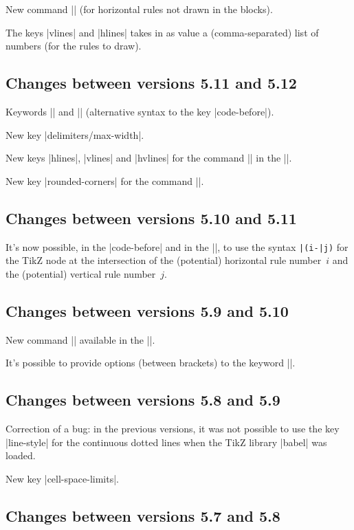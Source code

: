 \documentclass[dvipsnames]{article}%
\begin{document}
New command |\Hline| (for horizontal rules not drawn in the blocks).

The keys |vlines| and |hlines| takes in as value a (comma-separated) list of
numbers (for the rules to draw).

\subsection*{Changes between versions 5.11 and 5.12}

Keywords |\CodeBefore| and |\Body| (alternative syntax to the key
|code-before|). 

New key |delimiters/max-width|.

New keys |hlines|, |vlines| and |hvlines| for the command |\SubMatrix| in the
|\CodeAfter|. 

New key |rounded-corners| for the command |\Block|.

\subsection*{Changes between versions 5.10 and 5.11}

It's now possible, in the |code-before| and in the |\CodeAfter|, to use the
syntax \verb+|(i-|j)+ for the TikZ node at the intersection of the (potential)
horizontal rule number~$i$ and the (potential) vertical rule number~$j$.

\subsection*{Changes between versions 5.9 and 5.10}

New command |\SubMatrix| available in the |\CodeAfter|.

It's possible to provide options (between brackets) to the keyword |\CodeAfter|.

\subsection*{Changes between versions 5.8 and 5.9}

Correction of a bug: in the previous versions, it was not possible to use the
key |line-style| for the continuous dotted lines when the TikZ library |babel|
was loaded.

New key |cell-space-limits|.

\subsection*{Changes between versions 5.7 and 5.8}
\end{document}
